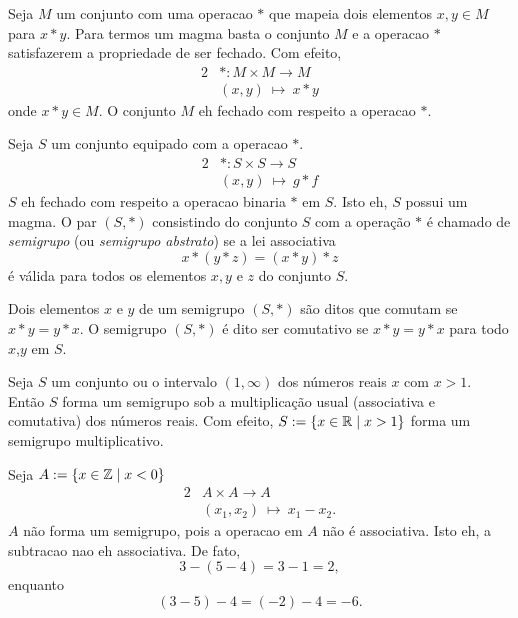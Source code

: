       \begin{definition}[Magma]
         Seja $M$ um conjunto com uma operacao $*$ que mapeia dois elementos $x,y \in M$ para $x * y$. Para termos um magma basta o conjunto $M$ e a operacao $*$ satisfazerem a propriedade de ser fechado. Com efeito, 
         \begin{alignat}{2}
            &*: M \times M \to M \nonumber\\
            &\left(x,y\right)\ \mapsto\ x * y
            \nonumber
         \end{alignat}
         onde $x*y \in M$. O conjunto $M$ eh fechado com respeito a operacao $*$.
      \begin{definition}[Semigrupos]
         Seja $S$ um conjunto equipado com a operacao $*$.
         \begin{alignat}{2}
            &*:S \times S \to S \nonumber\\
            &\left(x,y\right)\ \mapsto\ g * f
            \nonumber
         \end{alignat}
         $S$ eh fechado com respeito a operacao binaria $*$ em $S$. Isto eh, $S$ possui um magma. O par $\left(S,* \right)$ consistindo do conjunto $S$ com a operação $*$ é chamado de \emph{semigrupo} (ou \emph{semigrupo abstrato}) se a lei associativa $$x * (y * z) = (x * y) * z$$ é válida para todos os elementos $x,y$ e $z$ do conjunto $S$.
      \end{definition}

      \begin{definition}[Comutatividade]
         Dois elementos $x$ e $y$ de um semigrupo $(S, *)$ são ditos que comutam se $x* y = y* x$. O semigrupo $(S, *)$ é dito ser comutativo se $x* y = y * x$ para todo $x$,$y$ em $S$.
      \end{definition}
      \begin{exmp}
         Seja $S$ um conjunto ou o intervalo $(1,\infty)$ dos números reais $x$ com $x > 1$. Então $S$ forma um semigrupo sob a multiplicação usual (associativa e comutativa) dos números reais.
         Com efeito, $S := \{x \in \mathbb{R} \mid x > 1\}$ forma um semigrupo multiplicativo.
      \end{exmp}
      \begin{exmp}
         Seja $A:= \{x \in \mathbb{Z} \mid x < 0\}$
         \begin{alignat}{2}
            &A \times A \to A \nonumber\\
            &\left(x_{1},x_{2}\right)\ \mapsto\ x_{1} - x_{2}.
            \nonumber
         \end{alignat}
         $A$ não forma um semigrupo, pois a operacao em $A$ não é associativa. Isto eh, a subtracao nao eh associativa. De fato, $$3-(5-4)=3-1=2,$$ enquanto $$(3-5)-4=(-2)-4=-6.$$
      \end{exmp}


\end{definition}
